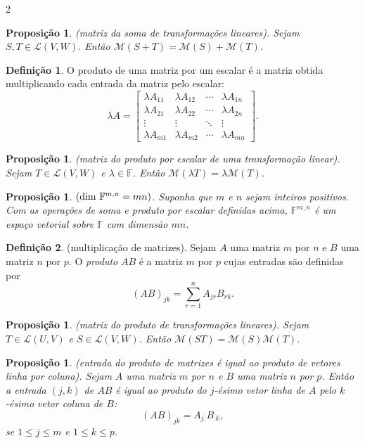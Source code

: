 \documentclass{article}
\theoremstyle{plain}
\newtheorem{prop}[thm]{Proposição}
\theoremstyle{definition}
\newtheorem{defn}{Definição}[section]
\theoremstyle{remark}
\begin{document}
\begin{multicols}{2}
\begin{prop} (matriz da soma de transformações lineares).
    Sejam \(S, T \in \mathcal{L}(V, W)\). Então \(\mathcal{M}(S + T) = \mathcal{M}(S) + \mathcal{M}(T)\).
\end{prop}

\begin{defn}
    O produto de uma matriz por um escalar é a matriz obtida multiplicando cada entrada da matriz pelo escalar:
    \[
        \lambda A = \begin{bmatrix}
            \lambda A_{11} & \lambda A_{12} & \cdots & \lambda A_{1n} \\
            \lambda A_{21} & \lambda A_{22} & \cdots & \lambda A_{2n} \\
            \vdots & \vdots & \ddots & \vdots \\
            \lambda A_{m1} & \lambda A_{m2} & \cdots & \lambda A_{mn}
        \end{bmatrix}.
    \]
\end{defn}

\begin{prop} (matriz do produto por escalar de uma transformação linear).
    Sejam \(T \in \mathcal{L}(V, W)\) e \(\lambda \in \mathbb{F}\). Então \(\mathcal{M}(\lambda T) = \lambda \mathcal{M}(T)\).
\end{prop}

\begin{prop} \((\textup{dim } \mathbb{F}^{m,n} = mn)\).
    Suponha que \(m\) e \(n\) sejam inteiros positivos. Com as operações de soma e produto por escalar definidas acima, \(\mathbb{F}^{m,n}\) é um espaço vetorial sobre \(\mathbb{F}\) com dimensão \(mn\).    
\end{prop}

\begin{defn} (multiplicação de matrizes).
    Sejam \(A\) uma matriz \(m\) por \(n\) e \(B\) uma matriz \(n\) por \(p\). O \emph{produto} \(AB\) é a matriz \(m\) por \(p\) cujas entradas são definidas por
    \[
        (AB)_{jk} = \sum_{r=1}^{n} A_{jr} B_{rk}.
    \]
\end{defn}

\begin{prop} (matriz do produto de transformações lineares).
    Sejam \(T \in \mathcal{L}(U, V)\) e \(S \in \mathcal{L}(V, W)\). Então \(\mathcal{M}(ST) = \mathcal{M}(S) \mathcal{M}(T)\).
\end{prop}

\begin{prop} (entrada do produto de matrizes é igual ao produto de vetores linha por coluna).
    Sejam \(A\) uma matriz \(m\) por \(n\) e \(B\) uma matriz \(n\) por \(p\). Então a entrada \((j, k)\) de \(AB\) é igual ao produto do \(j\)-ésimo vetor linha de \(A\) pelo \(k\)-ésimo vetor coluna de \(B\):
    \[
        (AB)_{jk} = A_{j.} B_{.k},
    \]
    \noindent se \(1 \leq j \leq m\) e \(1 \leq k \leq p\).
\end{prop}


\end{multicols}
\end{document}
